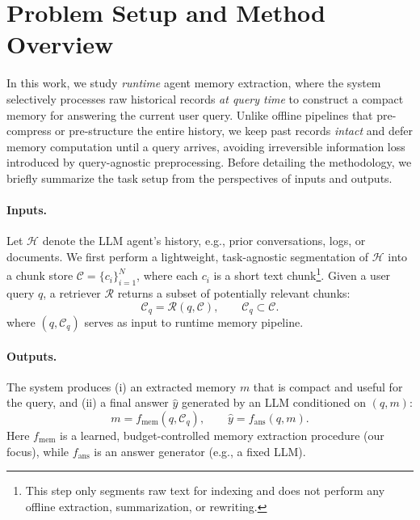 \section{Problem Setup and Method Overview}
\label{sec:overview}

In this work, we study \emph{runtime} agent memory extraction, where the system selectively processes raw historical records \emph{at query time} to construct a compact memory for answering the current user query. 
Unlike offline pipelines that pre-compress or pre-structure the entire history, we keep past records \emph{intact} and defer memory computation until a query arrives, avoiding irreversible information loss introduced by query-agnostic preprocessing.
Before detailing the methodology, we briefly summarize the task setup from the perspectives of inputs and outputs.


\paragraph{Inputs.}
Let $\mathcal{H}$ denote the LLM agent's history, e.g., prior conversations, logs, or documents.
We first perform a lightweight, task-agnostic segmentation of $\mathcal{H}$ into a chunk store $\mathcal{C}=\{c_i\}_{i=1}^{N}$, where each $c_i$ is a short text chunk\footnote{This step only segments raw text for indexing and does not perform any offline extraction, summarization, or rewriting.}.
Given a user query $q$, a retriever $\mathcal{R}$ returns a subset of potentially relevant chunks:
\begin{equation}
\mathcal{C}_q = \mathcal{R}(q, \mathcal{C}), \qquad \mathcal{C}_q \subset \mathcal{C}.
\end{equation}
where $(q, \mathcal{C}_q)$ serves as input to runtime memory pipeline.

\paragraph{Outputs.}
The system produces (i) an extracted memory $m$ that is compact and useful for the query, and (ii) a final answer $\hat{y}$ generated by an LLM conditioned on $(q,m)$:
\begin{equation}
m = f_{\text{mem}}(q, \mathcal{C}_q), \qquad \hat{y} = f_{\text{ans}}(q,m).
\end{equation}
Here $f_{\text{mem}}$ is a learned, budget-controlled memory extraction procedure (our focus), while $f_{\text{ans}}$ is an answer generator (e.g., a fixed LLM).



